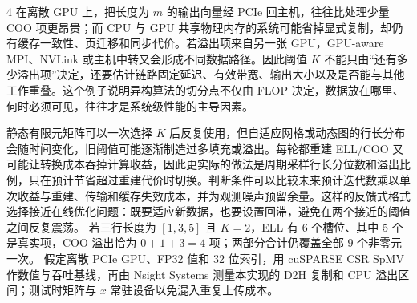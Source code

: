 \begin{solutionexercise}{4}
在离散 GPU 上，把长度为 $m$ 的输出向量经 PCIe 回主机，往往比处理少量 COO 项更昂贵；而 CPU 与 GPU 共享物理内存的系统可能省掉显式复制，却仍有缓存一致性、页迁移和同步代价。若溢出项来自另一张 GPU，GPU-aware MPI、NVLink 或主机中转又会形成不同数据路径。因此阈值 $K$ 不能只由“还有多少溢出项”决定，还要估计链路固定延迟、有效带宽、输出大小以及是否能与其他工作重叠。这个例子说明异构算法的切分点不仅由 FLOP 决定，数据放在哪里、何时必须可见，往往才是系统级性能的主导因素。

静态有限元矩阵可以一次选择 $K$ 后反复使用，但自适应网格或动态图的行长分布会随时间变化，旧阈值可能逐渐制造过多填充或溢出。每轮都重建 ELL/COO 又可能让转换成本吞掉计算收益，因此更实际的做法是周期采样行长分位数和溢出比例，只在预计节省超过重建代价时切换。判断条件可以比较未来预计迭代数乘以单次收益与重建、传输和缓存失效成本，并为观测噪声预留余量。这样的反馈式格式选择接近在线优化问题：既要适应新数据，也要设置回滞，避免在两个接近的阈值之间反复震荡。
\variantheading 若三行长度为 $[1,3,5]$ 且 $K=2$，ELL 有 6 个槽位、其中 5 个是真实项，COO 溢出恰为 $0+1+3=4$ 项；两部分合计仍覆盖全部 9 个非零元一次。
\practiceheading 假定离散 PCIe GPU、FP32 值和 32 位索引，用 cuSPARSE CSR SpMV 作数值与吞吐基线，再由 Nsight Systems 测量本实现的 D2H 复制和 CPU 溢出区间；测试时矩阵与 $x$ 常驻设备以免混入重复上传成本。
\end{solutionexercise}


